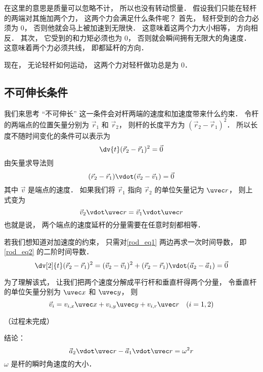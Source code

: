 

在这里的意思是质量可以忽略不计， 所以也没有转动惯量． 假设我们只能在轻杆的两端对其施加两个力， 这两个力会满足什么条件呢？ 首先， 轻杆受到的合力必须为 0， 否则他就会马上被加速到无限快． 这意味着这两个力大小相等， 方向相反． 其次， 它受到的和力矩必须也为 0， 否则就会瞬间拥有无限大的角速度． 这意味着两个力必须共线， 即都延杆的方向．

现在， 无论轻杆如何运动， 这两个力对轻杆做功总是为 0．

\subsection{不可伸长条件}
我们来思考 “不可伸长” 这一条件会对杆两端的速度和加速度带来什么约束． 令杆的两端点的位置矢量分别为 $\vec r_1$ 和 $\vec r_2$， 则杆的长度平方为 $(\vec r_2 - \vec r_1)^2$． 所以长度不随时间变化的条件可以表示为
\begin{equation}\label{rod_eq2}
\dv{t} (\vec r_2 - \vec r_1)^2 = \vec 0
\end{equation}
由矢量求导法则
\begin{equation}\label{rod_eq1}
(\vec r_2 - \vec r_1) \vdot (\vec v_2 - \vec v_1) = \vec 0
\end{equation}
其中 $\vec v$ 是端点的速度． 如果我们将 $\vec r_1$ 指向 $\vec r_2$ 的单位矢量记为 $\uvec r$， 则上式变为
\begin{equation}
\vec v_2 \vdot \uvec r = \vec v_1 \vdot \uvec r
\end{equation}
也就是说， 两个端点的速度延杆的分量需要在任意时刻都相等．

若我们想知道对加速度的约束， 只需对\autoref{rod_eq1} 两边再求一次时间导数， 即\autoref{rod_eq2} 的二阶时间导数．
\begin{equation}
\dv[2]{t} (\vec r_2 - \vec r_1)^2 = (\vec v_2 - \vec v_1)^2 + (\vec r_2 - \vec r_1) \vdot (\vec a_2 - \vec a_1) = \vec 0
\end{equation}

为了理解该式， 让我们把两个速度分解成平行杆和垂直杆得两个分量， 令垂直杆的单位矢量分别为 $\uvec x$ 和 $\uvec y$， 则
\begin{equation}
\vec v_i = v_{i, x} \uvec x + v_{i, y} \uvec y + v_{i, r} \uvec r \quad (i = 1, 2)
\end{equation}

（过程未完成）

结论：
\begin{equation}
\vec a_2 \vdot \uvec r - \vec a_1 \vdot \uvec r  = \omega^2 r
\end{equation}
$\omega$ 是杆的瞬时角速度的大小．
